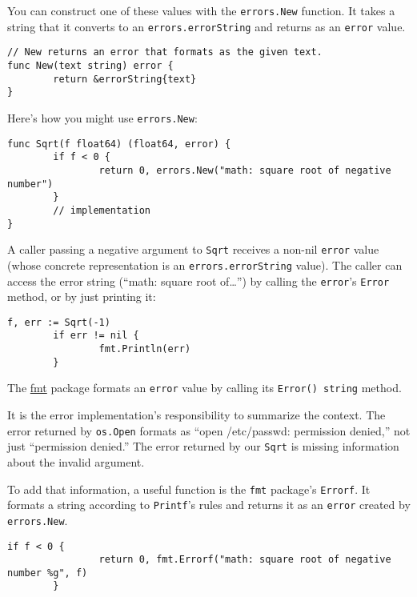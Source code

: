 You can construct one of these values with the \texttt{errors.New}
function. It takes a string that it converts to an
\texttt{errors.errorString} and returns as an \texttt{error} value.

\begin{Verbatim}[frame=single]
// New returns an error that formats as the given text.
func New(text string) error {
        return &errorString{text}
}
\end{Verbatim}

Here's how you might use \texttt{errors.New}:

\begin{Verbatim}[frame=single]
func Sqrt(f float64) (float64, error) {
        if f < 0 {
                return 0, errors.New("math: square root of negative number")
        }
        // implementation
}
\end{Verbatim}

A caller passing a negative argument to \texttt{Sqrt} receives a non-nil
\texttt{error} value (whose concrete representation is an
\texttt{errors.errorString} value). The caller can access the error
string (``math: square root of\ldots{}'') by calling the
\texttt{error}'s \texttt{Error} method, or by just printing it:

\begin{Verbatim}[frame=single]
        f, err := Sqrt(-1)
        if err != nil {
                fmt.Println(err)
        }
\end{Verbatim}

The \href{http://golang.org/pkg/fmt/}{fmt} package formats an
\texttt{error} value by calling its \texttt{Error() string} method.

It is the error implementation's responsibility to summarize the
context. The error returned by \texttt{os.Open} formats as ``open
/etc/passwd: permission denied,'' not just ``permission denied.''
The error returned by our \texttt{Sqrt} is missing information about
the invalid argument.

To add that information, a useful function is the \texttt{fmt}
package's \texttt{Errorf}. It formats a string according to
\texttt{Printf}'s rules and returns it as an \texttt{error} created
by \texttt{errors.New}.

\begin{Verbatim}[frame=single]
        if f < 0 {
                return 0, fmt.Errorf("math: square root of negative number %g", f)
        }
\end{Verbatim}

